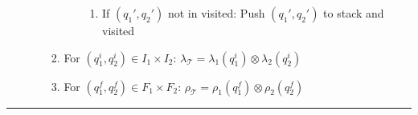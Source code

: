 \begin{itemize}
\begin{itemize}
\begin{enumerate}
\begin{enumerate}
\begin{enumerate}
                    \item If $(q_1', q_2')$ not in visited: Push $(q_1', q_2')$ to stack and visited
                \end{enumerate}
            \end{enumerate}
            \item For $(q_1^i, q_2^i) \in I_1 \times I_2$: $
            \lambda_\mathcal{T} = \lambda_1(q_1^i) \otimes \lambda_2(q_2^i)
            $
            \item For $(q_1^f, q_2^f) \in F_1 \times F_2$: $
            \rho_\mathcal{T} = \rho_1(q_1^f) \otimes \rho_2(q_2^f)
            $
        \end{enumerate}
    \end{itemize}
\end{itemize}

{\color{black}\hrule height 0.001mm}

